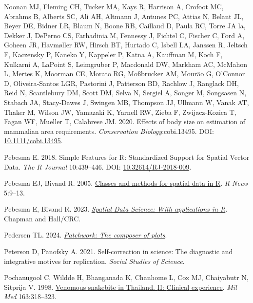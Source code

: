 \documentclass[10pt,a4paper]{article}
\newlength{\cslhangindent}
\newenvironment{CSLReferences}[2] %
 {\begin{list}{}{%
  \setlength{\itemindent}{0pt}
  \setlength{\leftmargin}{0pt}
  \setlength{\parsep}{0pt}
  \ifodd #1
   \setlength{\leftmargin}{\cslhangindent}
   \setlength{\itemindent}{-1\cslhangindent}
  \fi
  \setlength{\itemsep}{#2\baselineskip}}}
 {\end{list}}
\begin{document}
\begin{CSLReferences}{1}{0}
Noonan MJ, Fleming CH, Tucker MA, Kays R, Harrison A, Crofoot MC, Abrahms B, Alberts SC, Ali AH, Altmann J, Antunes PC, Attias N, Belant JL, Beyer DE, Bidner LR, Blaum N, Boone RB, Caillaud D, Paula RC, Torre JA la, Dekker J, DePerno CS, Farhadinia M, Fennessy J, Fichtel C, Fischer C, Ford A, Goheen JR, Havmøller RW, Hirsch BT, Hurtado C, Isbell LA, Janssen R, Jeltsch F, Kaczensky P, Kaneko Y, Kappeler P, Katna A, Kauffman M, Koch F, Kulkarni A, LaPoint S, Leimgruber P, Macdonald DW, Markham AC, McMahon L, Mertes K, Moorman CE, Morato RG, Moßbrucker AM, Mourão G, O'Connor D, Oliveira‐Santos LGR, Pastorini J, Patterson BD, Rachlow J, Ranglack DH, Reid N, Scantlebury DM, Scott DM, Selva N, Sergiel A, Songer M, Songsasen N, Stabach JA, Stacy‐Dawes J, Swingen MB, Thompson JJ, Ullmann W, Vanak AT, Thaker M, Wilson JW, Yamazaki K, Yarnell RW, Zieba F, Zwijacz‐Kozica T, Fagan WF, Mueller T, Calabrese JM. 2020. Effects of body size on estimation of mammalian area requirements. \emph{Conservation Biology}:cobi.13495. DOI: \href{https://doi.org/10.1111/cobi.13495}{10.1111/cobi.13495}.

Pebesma E. 2018. {Simple Features for R: Standardized Support for Spatial Vector Data}. \emph{{The R Journal}} 10:439--446. DOI: \href{https://doi.org/10.32614/RJ-2018-009}{10.32614/RJ-2018-009}.

Pebesma EJ, Bivand R. 2005. \href{https://CRAN.R-project.org/doc/Rnews/}{Classes and methods for spatial data in {R}}. \emph{R News} 5:9--13.

Pebesma E, Bivand R. 2023. \emph{\href{https://r-spatial.org/book/}{{Spatial Data Science: With applications in R}}}. {Chapman and Hall/CRC}.

Pedersen TL. 2024. \emph{\href{https://CRAN.R-project.org/package=patchwork}{Patchwork: The composer of plots}}.

Peterson D, Panofsky A. 2021. Self-correction in science: {The} diagnostic and integrative motives for replication. \emph{Social Studies of Science}.

Pochanugool C, Wildde H, Bhanganada K, Chanhome L, Cox MJ, Chaiyabutr N, Sitprija V. 1998. \href{https://www.ncbi.nlm.nih.gov/pubmed/9597849}{Venomous snakebite in {Thailand}. {II}: {Clinical} experience}. \emph{Mil Med} 163:318--323.


\end{CSLReferences}
\end{document}
